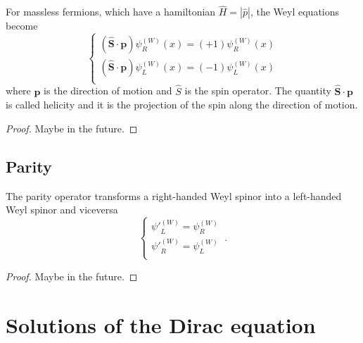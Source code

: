     For massless fermions, which have a hamiltonian $\hat H = |\hat p|$, the Weyl equations become
    \begin{equation*}
        \begin{cases}
            (\hat{\mathbf S} \cdot \mathbf p) \psi^{(W)}_R (x) = (+1) \psi^{(W)}_R (x) \\
            (\hat{\mathbf S} \cdot \mathbf p) \psi^{(W)}_L (x) = (-1) \psi^{(W)}_L (x) \\
        \end{cases}
    \end{equation*}
    where $\mathbf p$ is the direction of motion and $\hat S$ is the spin operator. The quantity $\hat{\mathbf S} \cdot \mathbf p$ is called helicity and it is the projection of the spin along the direction of motion. 
    \begin{proof}
        Maybe in the future.
    \end{proof}

\section{Parity} 

    The parity operator transforms a right-handed Weyl spinor into a left-handed Weyl spinor and viceversa
    \begin{equation*}
        \begin{cases}
            {\psi'}_L^{(W)} = \psi_R^{(W)} \\
            {\psi'}_R^{(W)} = \psi_L^{(W)} \\
        \end{cases} ~.
    \end{equation*}
    \begin{proof}
        Maybe in the future.
    \end{proof}

\chapter{Solutions of the Dirac equation}

